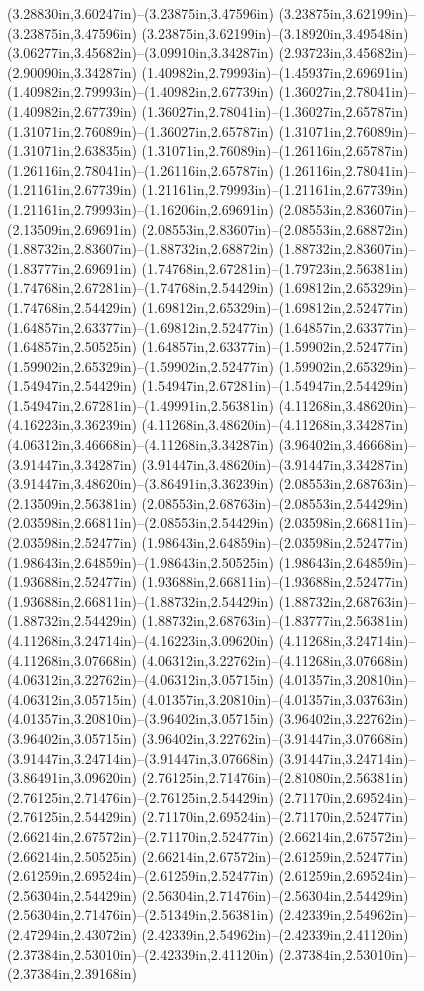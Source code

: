 (3.28830in,3.60247in)--(3.23875in,3.47596in) (3.23875in,3.62199in)--(3.23875in,3.47596in) (3.23875in,3.62199in)--(3.18920in,3.49548in) (3.06277in,3.45682in)--(3.09910in,3.34287in) (2.93723in,3.45682in)--(2.90090in,3.34287in) (1.40982in,2.79993in)--(1.45937in,2.69691in) (1.40982in,2.79993in)--(1.40982in,2.67739in) (1.36027in,2.78041in)--(1.40982in,2.67739in) (1.36027in,2.78041in)--(1.36027in,2.65787in) (1.31071in,2.76089in)--(1.36027in,2.65787in) (1.31071in,2.76089in)--(1.31071in,2.63835in) (1.31071in,2.76089in)--(1.26116in,2.65787in) (1.26116in,2.78041in)--(1.26116in,2.65787in) (1.26116in,2.78041in)--(1.21161in,2.67739in) (1.21161in,2.79993in)--(1.21161in,2.67739in) (1.21161in,2.79993in)--(1.16206in,2.69691in) (2.08553in,2.83607in)--(2.13509in,2.69691in) (2.08553in,2.83607in)--(2.08553in,2.68872in) (1.88732in,2.83607in)--(1.88732in,2.68872in) (1.88732in,2.83607in)--(1.83777in,2.69691in) (1.74768in,2.67281in)--(1.79723in,2.56381in) (1.74768in,2.67281in)--(1.74768in,2.54429in) (1.69812in,2.65329in)--(1.74768in,2.54429in) (1.69812in,2.65329in)--(1.69812in,2.52477in) (1.64857in,2.63377in)--(1.69812in,2.52477in) (1.64857in,2.63377in)--(1.64857in,2.50525in) (1.64857in,2.63377in)--(1.59902in,2.52477in) (1.59902in,2.65329in)--(1.59902in,2.52477in) (1.59902in,2.65329in)--(1.54947in,2.54429in) (1.54947in,2.67281in)--(1.54947in,2.54429in) (1.54947in,2.67281in)--(1.49991in,2.56381in) (4.11268in,3.48620in)--(4.16223in,3.36239in) (4.11268in,3.48620in)--(4.11268in,3.34287in) (4.06312in,3.46668in)--(4.11268in,3.34287in) (3.96402in,3.46668in)--(3.91447in,3.34287in) (3.91447in,3.48620in)--(3.91447in,3.34287in) (3.91447in,3.48620in)--(3.86491in,3.36239in) (2.08553in,2.68763in)--(2.13509in,2.56381in) (2.08553in,2.68763in)--(2.08553in,2.54429in) (2.03598in,2.66811in)--(2.08553in,2.54429in) (2.03598in,2.66811in)--(2.03598in,2.52477in) (1.98643in,2.64859in)--(2.03598in,2.52477in) (1.98643in,2.64859in)--(1.98643in,2.50525in) (1.98643in,2.64859in)--(1.93688in,2.52477in) (1.93688in,2.66811in)--(1.93688in,2.52477in) (1.93688in,2.66811in)--(1.88732in,2.54429in) (1.88732in,2.68763in)--(1.88732in,2.54429in) (1.88732in,2.68763in)--(1.83777in,2.56381in) (4.11268in,3.24714in)--(4.16223in,3.09620in) (4.11268in,3.24714in)--(4.11268in,3.07668in) (4.06312in,3.22762in)--(4.11268in,3.07668in) (4.06312in,3.22762in)--(4.06312in,3.05715in) (4.01357in,3.20810in)--(4.06312in,3.05715in) (4.01357in,3.20810in)--(4.01357in,3.03763in) (4.01357in,3.20810in)--(3.96402in,3.05715in) (3.96402in,3.22762in)--(3.96402in,3.05715in) (3.96402in,3.22762in)--(3.91447in,3.07668in) (3.91447in,3.24714in)--(3.91447in,3.07668in) (3.91447in,3.24714in)--(3.86491in,3.09620in) (2.76125in,2.71476in)--(2.81080in,2.56381in) (2.76125in,2.71476in)--(2.76125in,2.54429in) (2.71170in,2.69524in)--(2.76125in,2.54429in) (2.71170in,2.69524in)--(2.71170in,2.52477in) (2.66214in,2.67572in)--(2.71170in,2.52477in) (2.66214in,2.67572in)--(2.66214in,2.50525in) (2.66214in,2.67572in)--(2.61259in,2.52477in) (2.61259in,2.69524in)--(2.61259in,2.52477in) (2.61259in,2.69524in)--(2.56304in,2.54429in) (2.56304in,2.71476in)--(2.56304in,2.54429in) (2.56304in,2.71476in)--(2.51349in,2.56381in) (2.42339in,2.54962in)--(2.47294in,2.43072in) (2.42339in,2.54962in)--(2.42339in,2.41120in) (2.37384in,2.53010in)--(2.42339in,2.41120in) (2.37384in,2.53010in)--(2.37384in,2.39168in) 